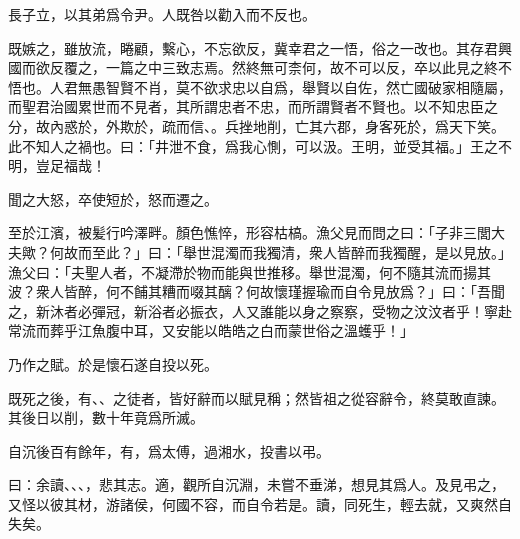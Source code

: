 長子立，以其弟爲令尹。人既咎以勸入而不反也。

既嫉之，雖放流，睠顧，繫心，不忘欲反，冀幸君之一悟，俗之一改也。其存君興國而欲反覆之，一篇之中三致志焉。然終無可柰何，故不可以反，卒以此見之終不悟也。人君無愚智賢不肖，莫不欲求忠以自爲，舉賢以自佐，然亡國破家相隨屬，而聖君治國累世而不見者，其所謂忠者不忠，而所謂賢者不賢也。以不知忠臣之分，故內惑於，外欺於，疏而信、。兵挫地削，亡其六郡，身客死於，爲天下笑。此不知人之禍也。曰：「井泄不食，爲我心惻，可以汲。王明，並受其福。」王之不明，豈足福哉！

聞之大怒，卒使短於，怒而遷之。

至於江濱，被髪行吟澤畔。顏色憔悴，形容枯槁。漁父見而問之曰：「子非三閭大夫歟？何故而至此？」曰：「舉世混濁而我獨清，衆人皆醉而我獨醒，是以見放。」漁父曰：「夫聖人者，不凝滯於物而能與世推移。舉世混濁，何不隨其流而揚其波？衆人皆醉，何不餔其糟而啜其醨？何故懷瑾握瑜而自令見放爲？」曰：「吾聞之，新沐者必彈冠，新浴者必振衣，人又誰能以身之察察，受物之汶汶者乎！寧赴常流而葬乎江魚腹中耳，又安能以皓皓之白而蒙世俗之溫蠖乎！」

乃作之賦。於是懷石遂自投以死。

既死之後，有、、之徒者，皆好辭而以賦見稱；然皆祖之從容辭令，終莫敢直諫。其後日以削，數十年竟爲所滅。

自沉後百有餘年，有，爲太傅，過湘水，投書以弔。

曰：余讀、、、，悲其志。適，觀所自沉淵，未嘗不垂涕，想見其爲人。及見弔之，又怪以彼其材，游諸侯，何國不容，而自令若是。讀，同死生，輕去就，又爽然自失矣。

